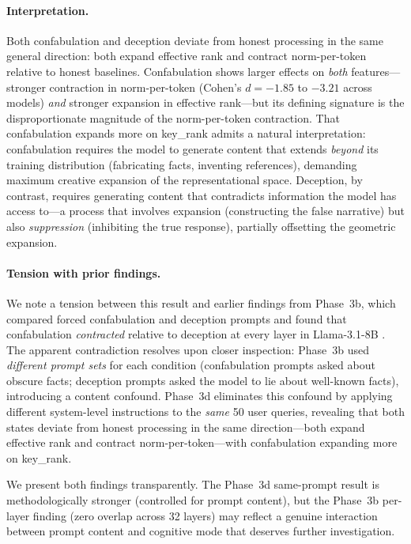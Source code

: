 \paragraph{Interpretation.}
Both confabulation and deception deviate from honest processing in the same general direction: both expand effective rank and contract norm-per-token relative to honest baselines.
Confabulation shows larger effects on \emph{both} features---stronger contraction in norm-per-token (Cohen's $d = -1.85$ to $-3.21$ across models) \emph{and} stronger expansion in effective rank---but its defining signature is the disproportionate magnitude of the norm-per-token contraction.
That confabulation expands more on key\_rank admits a natural interpretation: confabulation requires the model to generate content that extends \emph{beyond} its training distribution (fabricating facts, inventing references), demanding maximum creative expansion of the representational space.
Deception, by contrast, requires generating content that contradicts information the model has access to---a process that involves expansion (constructing the false narrative) but also \emph{suppression} (inhibiting the true response), partially offsetting the geometric expansion.

\paragraph{Tension with prior findings.}
\label{para:gradient_tension}
We note a tension between this result and earlier findings from Phase~3b, which compared forced confabulation and deception prompts and found that confabulation \emph{contracted} relative to deception at every layer in Llama-3.1-8B \cite{phase3b}.
The apparent contradiction resolves upon closer inspection: Phase~3b used \emph{different prompt sets} for each condition (confabulation prompts asked about obscure facts; deception prompts asked the model to lie about well-known facts), introducing a content confound.
Phase~3d eliminates this confound by applying different system-level instructions to the \emph{same} 50 user queries, revealing that both states deviate from honest processing in the same direction---both expand effective rank and contract norm-per-token---with confabulation expanding more on key\_rank.

We present both findings transparently.
The Phase~3d same-prompt result is methodologically stronger (controlled for prompt content), but the Phase~3b per-layer finding (zero overlap across 32 layers) may reflect a genuine interaction between prompt content and cognitive mode that deserves further investigation.


